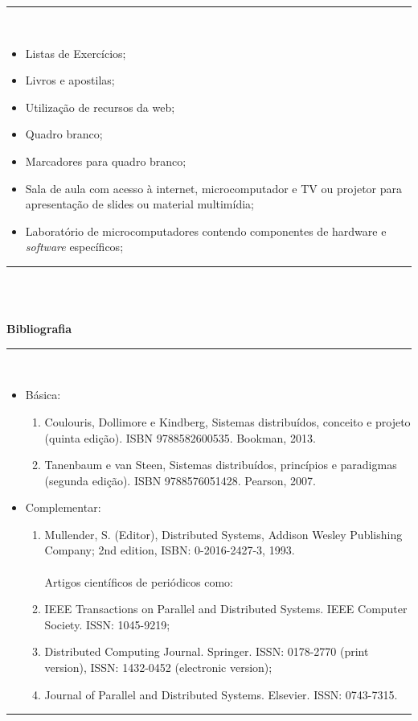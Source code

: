 \vspace{-5mm}
\noindent\rule{16.5cm}{0.4pt}
\\
\begin{itemize} 
  \item Listas de Exercícios;
  \item Livros e apostilas;
  \item Utilização de recursos da web;
  \item Quadro branco;
  \item Marcadores para quadro branco;
  \item Sala de aula com acesso à internet, microcomputador e TV ou projetor para apresentação de slides ou material multimídia;
  \item Laboratório de microcomputadores contendo componentes de hardware e \textit{software} específicos;
\end{itemize}
\noindent\rule{16.5cm}{0.4pt}\\
\\
\vspace{-12mm}
\begin{center}\textbf{Bibliografia}\end{center}
\vspace{-5mm}
\noindent\rule{16.5cm}{0.4pt}
\\
\begin{itemize} 
  \item Básica:
	\begin{enumerate}
	\item Coulouris, Dollimore e Kindberg, Sistemas distribuídos, conceito e projeto (quinta edição). ISBN 9788582600535. Bookman, 2013.
	\item Tanenbaum e van Steen, Sistemas distribuídos, princípios e paradigmas (segunda edição). ISBN 9788576051428. Pearson, 2007.
	\end{enumerate}
  \item Complementar:
	\begin{enumerate} 
	\item Mullender, S. (Editor), Distributed Systems, Addison Wesley Publishing Company; 2nd edition, ISBN: 0-2016-2427-3, 1993.\\
        \\
	Artigos cient\'ificos de peri\'odicos como: 
	\item IEEE Transactions on Parallel and Distributed Systems. IEEE Computer Society. ISSN: 1045-9219;
	\item Distributed Computing Journal. Springer. ISSN: 0178-2770 (print version), ISSN: 1432-0452 (electronic version);
	\item Journal of Parallel and Distributed Systems. Elsevier. ISSN: 0743-7315.
	\end{enumerate}
\end{itemize}
\noindent\rule{16.5cm}{0.4pt}\\
\\
